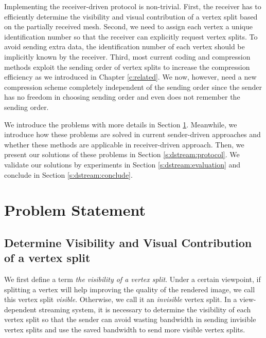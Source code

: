     Implementing the receiver-driven protocol is non-trivial. 
    First, the receiver has to efficiently determine the visibility and visual contribution
    of a vertex split based on the partially received mesh. 
    Second, we need to assign each vertex a unique identification number
    so that the receiver can explicitly request vertex splits. 
    To avoid sending extra data, the identification number of each vertex 
    should be implicitly known by the receiver.
    Third, most current coding and compression methods exploit the sending order of vertex splits
    to increase the compression efficiency as we introduced in Chapter \ref{c:related}.
    We now, however, need a new compression scheme
    completely independent of the sending order since the sender has no freedom in choosing sending order
    and even does not remember the sending order.

    We introduce the problems with more details in Section \ref{s:dstream:terms}. 
    Meanwhile, we introduce how these problems are solved in current sender-driven approaches and 
    whether these methods are applicable in receiver-driven approach.
    Then, we present our solutions of these problems in Section \ref{s:dstream:protocol}.
    We validate our solutions by experiments in Section \ref{s:dstream:evaluation} 
    and conclude in Section \ref{s:dstream:conclude}.

\section{Problem Statement}
\label{s:dstream:terms}
    \subsection{Determine Visibility and Visual Contribution of a vertex split}
    We first define a term \emph{the visibility of a vertex split}. Under a certain
    viewpoint, if splitting a vertex will help improving the quality of the rendered image,
    we call this vertex split \emph{visible}. Otherwise, we call it an \emph{invisible}
    vertex split.
    In a view-dependent streaming system, it is necessary to determine the visibility
    of each vertex split so that the sender can avoid wasting bandwidth in sending invisible 
    vertex splits and use the saved bandwidth to send more visible vertex splits.


